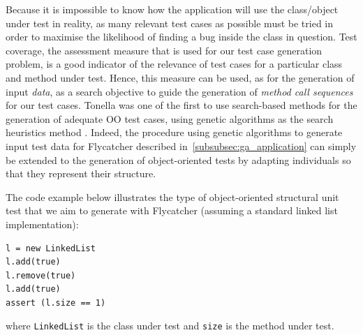 \documentclass[a4paper,11pt,titlepage]{report}
\begin{document}
Because it is impossible to know how the application will use the class/object under test in reality, as many relevant test cases as possible must be tried in order to maximise the likelihood of finding a bug inside the class in question. Test coverage, the assessment measure that is used for our test case generation problem, is a good indicator of the relevance of test cases for a particular class and method under test. Hence, this measure can be used, as for the generation of input \emph{data}, as a search objective to guide the generation of \emph{method call sequences} for our test cases. Tonella was one of the first to use search-based methods for the generation of adequate OO test cases, using genetic algorithms as the search heuristics method \cite{tonella2004evolutionary}. Indeed, the procedure using genetic algorithms to generate input test data for \textsf{Flycatcher} described in~\ref{subsubsec:ga_application} can simply be extended to the generation of object-oriented tests by adapting individuals so that they represent their structure.

The code example below illustrates the type of object-oriented structural unit test that we aim to generate with \textsf{Flycatcher} (assuming a standard linked list implementation):

\begin{verbatim}
l = new LinkedList
l.add(true)
l.remove(true)
l.add(true)
assert (l.size == 1)
\end{verbatim}

where \texttt{LinkedList} is the class under test and \texttt{size} is the method under test.



\end{document}
